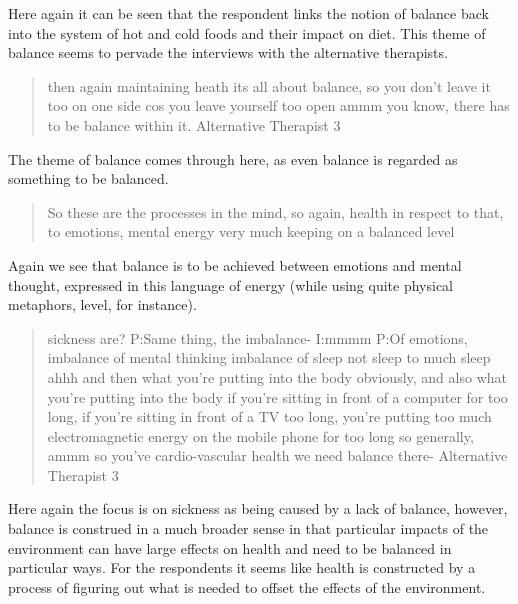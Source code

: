 Here again it can be seen that the respondent links the notion of balance back into the system of hot and cold foods and their impact on diet. This theme of balance seems to pervade the interviews with the alternative therapists. 

\begin{quotation}
then again maintaining heath its all about balance, so you don't leave it too on one side cos you leave yourself too open ammm you know, there has to be balance within it.
Alternative Therapist 3
\end{quotation}

The theme of balance comes through here, as even balance is regarded as something to be balanced. 


\begin{quotation}
   So these are the processes in the mind, so again, health in respect to that, to emotions, mental energy very much keeping on a balanced level

\end{quotation}

Again we see that balance is to be achieved between emotions and mental thought, expressed in this language of energy (while using quite physical metaphors, level, for instance). 

\begin{quotation}
  sickness are?
P:Same thing, the imbalance-
I:mmmm
P:Of emotions, imbalance of mental thinking imbalance of sleep not sleep to much sleep ahhh and then what you're putting into the body obviously, and also what you're putting into the body if you're sitting in front of a computer for too long, if you're sitting in front of a TV too long, you're putting too much electromagnetic energy on the mobile phone for too long so generally, ammm so you've cardio-vascular health we need balance there-
Alternative Therapist 3
\end{quotation}

Here again the focus is on sickness as being caused by a lack of balance, however, balance is construed in a much broader sense in that particular impacts of the environment can have large effects on health and need to be balanced in particular ways. For the respondents it seems like health is constructed by a process of figuring out what is needed to offset the effects of the environment. 




